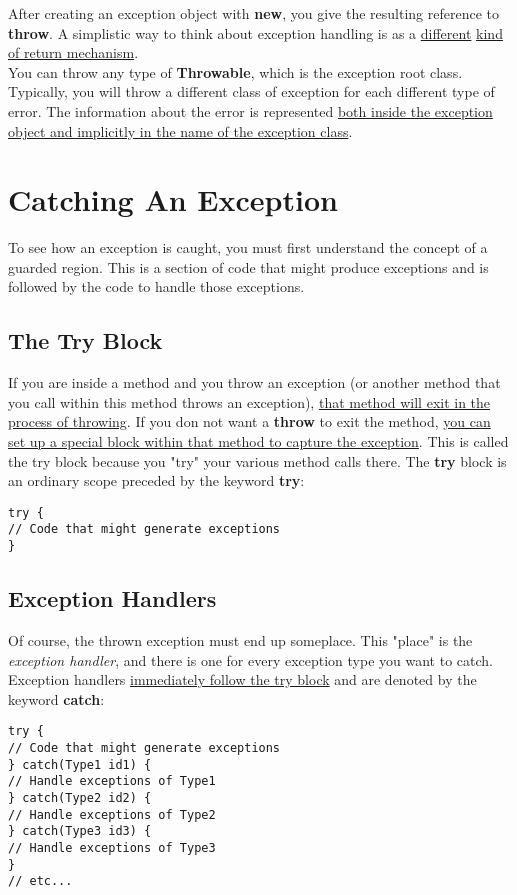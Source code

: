 \documentclass[10pt,letterpaper]{report}
\begin{document}
After creating an exception object with \textbf{new}, you give the resulting reference to \textbf{throw}. A simplistic way to think about exception handling is as a \underline{different} \underline{kind of return mechanism}.\\
You can throw any type of \textbf{Throwable}, which is the exception root class. Typically, you will throw a different class of exception for each different type of error. The information about the error is represented \underline{both inside the exception} \underline{object and implicitly in the name of the exception class}.

\section{Catching An Exception}
To see how an exception is caught, you must first understand the concept of a guarded region. This is a section of code that might produce exceptions and is followed by the code to handle those exceptions.

\subsection{The Try Block}
If you are inside a method and you throw an exception (or another method that you call within this method throws an exception), \underline{that method will exit in the} \underline{process of throwing}. If you don not want a \textbf{throw} to exit the method, \underline{you can} \underline{set up a special block within that method to capture the exception}. This is called the try block because you "try" your various method calls there. The \textbf{try} block is an ordinary scope preceded by the keyword \textbf{try}:

\begin{lstlisting}
try {
// Code that might generate exceptions
}
\end{lstlisting}

\subsection{Exception Handlers}
Of course, the thrown exception must end up someplace. This "place" is the \textit{exception handler}, and there is one for every exception type you want to catch. Exception handlers \underline{immediately follow the try block} and are denoted by the keyword \textbf{catch}:

\begin{lstlisting}
try {
// Code that might generate exceptions
} catch(Type1 id1) {
// Handle exceptions of Type1
} catch(Type2 id2) {
// Handle exceptions of Type2
} catch(Type3 id3) {
// Handle exceptions of Type3
}
// etc...
\end{lstlisting}
\end{document}
